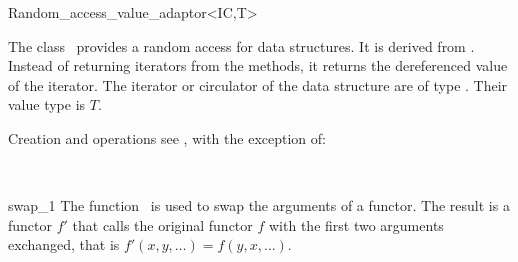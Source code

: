 \begin{ccRefClass}{Random_access_value_adaptor<IC,T>}
  
  \ccDefinition The class \ccClassTemplateName\ provides a random
  access for data structures. It is derived from
  . Instead of returning iterators from
  the  methods, it returns the dereferenced value of
  the iterator.  The iterator or circulator of the data structure are
  of type . Their value type is $T$.


  \ccOperations
  
  Creation and operations see , with
  the exception of:
  

  
  
  \ccSeeAlso
  \\

\end{ccRefClass}



\begin{ccRefFunction}{swap_1}
  \ccDefinition The function \ccRefName\ is used to swap the arguments
  of a functor. The result is a functor $f'$ that calls the original
  functor $f$ with the first two arguments exchanged, that is
  $f'(x,y,\ldots)= f(y,x,\ldots)$.
  
  
  
  \ccSeeAlso
  \\
  \\
  \\
  \\
  
\end{ccRefFunction}

